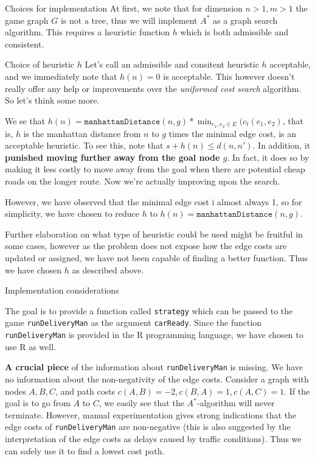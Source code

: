 \begin{subsection}{Choices for implementation}
  \begingroup
  \setlength{\parskip}{0.1em}
      At first, we note that for dimension $n > 1, m > 1$ the game graph $G$ is not a tree, thus we will implement $A^*$ as a graph search algorithm. This requires a heuristic function $h$ which is both admissible and consistent.
      \endgroup
      \begin{subsubsection}{Choice of heuristic $h$}
        \begingroup
        \setlength{\parskip}{0em}
        Let's call an admissible and consitent heuristic $h$ acceptable, and we immediately note that $h(n) = 0$ is acceptable. This however doesn't really offer any help or improvements over the \textit{uniformed cost search} algorithm. So let's think some more.
        \endgroup
        
        We se that $h(n) = \texttt{manhattanDistance}(n, g) * \min_{e_1, e_2\in E}(c_t(e_1, e_2)$, that is, $h$ is the manhattan distance from $n$ to $g$ times the minimal edge cost, is an acceptable heuristic. To see this, note that $s + h(n) \leq d(n, n')$. In addition, it \textbf{punished moving further away from the goal node $g$}. In fact, it does so by making it less costly to move away from the goal when there are potential cheap roads on the longer route. Now we're actually improving upon the search.
        
        However, we have observed that the minimal edge cost i almost always 1, so for simplicity, we have chosen to reduce $h$ to $h(n) = \texttt{manhattanDistance}(n, g)$.
        
        Further elaboration on what type of heuristic could be used might be fruitful in some cases, however as the problem does not expose how the edge costs are updated or assigned, we have not been capable of finding a better function. Thus we have chosen $h$ as described above.
      \end{subsubsection}
      
      
      \begin{subsubsection}{Implementation considerations}
        
        The goal is to provide a function called \texttt{strategy} which can be passed to the game \texttt{runDeliveryMan} as the argument \texttt{carReady}. Since the function \texttt{runDeliveryMan} is provided in the R programming language, we have chosen to use R as well.
        
        \textbf{A crucial piece} of the information about \texttt{runDeliveryMan} is missing. We have no information about the non-negativity of the edge costs. Consider a graph with nodes $A, B, C$, and path costs $c(A, B) = -2, c(B, A) = 1, c(A, C) = 1$. If the goal is to go from $A$ to $C$, we easily see that the $A^*$-algorithm will never terminate. However, manual experimentation gives strong indications that the edge costs of \texttt{runDeliveryMan} are non-negative (this is also suggested by the interpretation of the edge costs as delays caused by traffic conditions). Thus we can safely use it to find a lowest cost path. 
        

\end{subsubsection}
\end{subsection}
